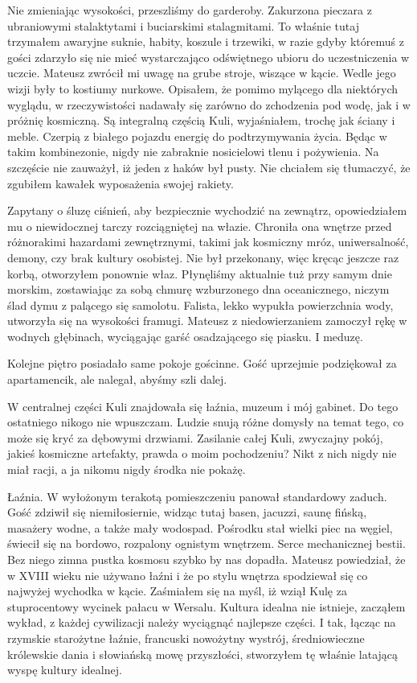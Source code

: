 Nie zmieniając wysokości, przeszliśmy do garderoby. Zakurzona pieczara z ubraniowymi stalaktytami i buciarskimi stalagmitami.
To właśnie tutaj trzymałem awaryjne suknie, habity, koszule i trzewiki, w razie gdyby któremuś z gości zdarzyło się nie mieć wystarczająco odświętnego ubioru do uczestniczenia w uczcie.
Mateusz zwrócił mi uwagę na grube stroje, wiszące w kącie. Wedle jego wizji były to kostiumy nurkowe.
Opisałem, że pomimo mylącego dla niektórych wyglądu, w rzeczywistości nadawały się zarówno do zchodzenia pod wodę, jak i w próżnię kosmiczną.
Są integralną częścią Kuli, wyjaśniałem, trochę jak ściany i meble. 
Czerpią z białego pojazdu energię do podtrzymywania życia. 
Będąc w takim kombinezonie, nigdy nie zabraknie nosicielowi tlenu i pożywienia.
Na szczęście nie zauważył, iż jeden z haków był pusty. 
Nie chciałem się tłumaczyć, że zgubiłem kawałek wyposażenia swojej rakiety.

Zapytany o śluzę ciśnień, aby bezpiecznie wychodzić na zewnątrz, opowiedziałem mu o niewidocznej tarczy rozciągniętej na włazie. 
Chroniła ona wnętrze przed różnorakimi hazardami zewnętrznymi, takimi jak kosmiczny mróz, uniwersalność, demony, czy brak kultury osobistej.
Nie był przekonany, więc kręcąc jeszcze raz korbą, otworzyłem ponownie właz. 
Płynęliśmy aktualnie tuż przy samym dnie morskim, zostawiając za sobą chmurę wzburzonego dna oceanicznego, niczym ślad dymu z palącego się samolotu.
Falista, lekko wypukła powierzchnia wody, utworzyła się na wysokości framugi. 
Mateusz z niedowierzaniem zamoczył rękę w wodnych głębinach, wyciągając garść osadzającego się piasku.
I meduzę.

Kolejne piętro posiadało same pokoje gościnne. 
Gość uprzejmie podziękował za apartamencik, ale nalegał, abyśmy szli dalej.

W centralnej części Kuli znajdowała się łaźnia, muzeum i mój gabinet. Do tego ostatniego nikogo nie wpuszczam.
Ludzie snują różne domysły na temat tego, co może się kryć za dębowymi drzwiami. 
Zasilanie całej Kuli, zwyczajny pokój, jakieś kosmiczne artefakty, prawda o moim pochodzeniu?
Nikt z nich nigdy nie miał racji, a ja nikomu nigdy środka nie pokażę.

Łaźnia. W wyłożonym terakotą pomieszczeniu panował standardowy zaduch. 
Gość zdziwił się niemiłosiernie, widząc tutaj basen, jacuzzi, saunę fińską, masażery wodne, a także mały wodospad.
Pośrodku stał wielki piec na węgiel, świecił się na bordowo, rozpalony ognistym wnętrzem. Serce mechanicznej bestii.
Bez niego zimna pustka kosmosu szybko by nas dopadła.
Mateusz powiedział, że w XVIII wieku nie używano łaźni i że po stylu wnętrza spodziewał się co najwyżej wychodka w kącie. 
Zaśmiałem się na myśl, iż wziął Kulę za stuprocentowy wycinek pałacu w Wersalu.
Kultura idealna nie istnieje, zacząłem wykład, z każdej cywilizacji należy wyciągnąć najlepsze części. 
I tak, łącząc na rzymskie starożytne łaźnie, francuski nowożytny wystrój, średniowieczne królewskie dania i słowiańską mowę przyszłości, 
stworzyłem tę właśnie latającą wyspę kultury idealnej.

